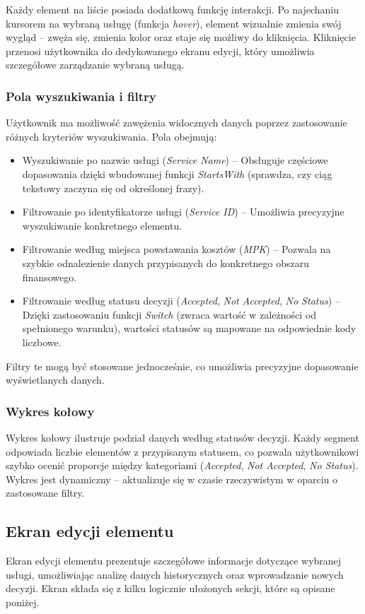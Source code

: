 Każdy element na liście posiada dodatkową funkcję interakcji. Po najechaniu kursorem na wybraną usługę (funkcja \textit{hover}), element wizualnie zmienia swój wygląd -- zwęża się, zmienia kolor oraz staje się możliwy do kliknięcia. Kliknięcie przenosi użytkownika do dedykowanego ekranu edycji, który umożliwia szczegółowe zarządzanie wybraną usługą.

\subsubsection*{Pola wyszukiwania i filtry}
Użytkownik ma możliwość zawężenia widocznych danych poprzez zastosowanie różnych kryteriów wyszukiwania. Pola obejmują:
\begin{itemize}
   \item {Wyszukiwanie po nazwie usługi (\textit{Service Name})} -- Obsługuje częściowe dopasowania dzięki wbudowanej funkcji \textit{StartsWith} (sprawdza, czy ciąg tekstowy zaczyna się od określonej frazy).
   \item {Filtrowanie po identyfikatorze usługi (\textit{Service ID})} -- Umożliwia precyzyjne wyszukiwanie konkretnego elementu.
   \item {Filtrowanie według miejsca powstawania kosztów (\textit{MPK})} -- Pozwala na szybkie odnalezienie danych przypisanych do konkretnego obszaru finansowego.
   \item {Filtrowanie według statusu decyzji (\textit{Accepted}, \textit{Not Accepted}, \textit{No Status})} -- Dzięki zastosowaniu funkcji \textit{Switch} (zwraca wartość w zależności od spełnionego warunku), wartości statusów są mapowane na odpowiednie kody liczbowe.
\end{itemize}
Filtry te mogą być stosowane jednocześnie, co umożliwia precyzyjne dopasowanie wyświetlanych danych.

\subsubsection*{Wykres kołowy}
Wykres kołowy ilustruje podział danych według statusów decyzji. Każdy segment odpowiada liczbie elementów z przypisanym statusem, co pozwala użytkownikowi szybko ocenić proporcje między kategoriami (\textit{Accepted}, \textit{Not Accepted}, \textit{No Status}). Wykres jest dynamiczny -- aktualizuje się w czasie rzeczywistym w oparciu o zastosowane filtry.



\subsection{Ekran edycji elementu}
Ekran edycji elementu prezentuje szczegółowe informacje dotyczące wybranej usługi, umożliwiając analizę danych historycznych oraz wprowadzanie nowych decyzji. Ekran składa się z kilku logicznie ułożonych sekcji, które są opisane poniżej.

